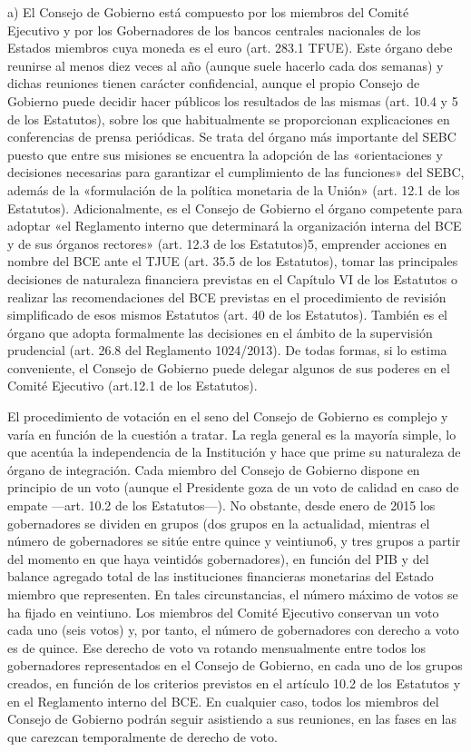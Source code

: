 \documentclass[10pt,a4paper]{article}
\begin{document}
a) El Consejo de Gobierno está compuesto por los miembros del Comité Ejecutivo y por los Gobernadores de los bancos centrales nacionales de los Estados miembros cuya moneda es el euro (art. 283.1 TFUE). Este órgano debe reunirse al menos diez veces al año (aunque suele hacerlo cada dos semanas) y dichas reuniones tienen carácter confidencial, aunque el propio Consejo de Gobierno puede decidir hacer públicos los resultados de las mismas (art. 10.4 y 5 de los Estatutos), sobre los que habitualmente se proporcionan explicaciones en conferencias de prensa periódicas. Se trata del órgano más importante del SEBC puesto que entre sus misiones se encuentra la adopción de las «orientaciones y decisiones necesarias para garantizar el cumplimiento de las funciones» del SEBC, además de la «formulación de la política monetaria de la Unión» (art. 12.1 de los Estatutos). Adicionalmente, es el Consejo de Gobierno el órgano competente para adoptar «el Reglamento interno que determinará la organización interna del BCE y de sus órganos rectores» (art. 12.3 de los Estatutos)5, emprender acciones en nombre del BCE ante el TJUE (art. 35.5 de los Estatutos), tomar las principales decisiones de naturaleza financiera previstas en el Capítulo VI de los Estatutos o realizar las recomendaciones del BCE previstas en el procedimiento de revisión simplificado de esos mismos Estatutos (art. 40 de los Estatutos). También es el órgano que adopta formalmente las decisiones en el ámbito de la supervisión prudencial (art. 26.8 del Reglamento 1024/2013). De todas formas, si lo estima conveniente, el Consejo de Gobierno  puede delegar algunos de sus poderes en el Comité Ejecutivo (art.12.1 de los Estatutos). 

El procedimiento de votación en el seno del Consejo de Gobierno es complejo y varía en función de la cuestión a tratar. La regla general es la mayoría simple, lo que acentúa la independencia de la Institución y hace que prime su naturaleza de órgano de integración. Cada miembro del Consejo de Gobierno dispone en principio de un voto (aunque el Presidente goza de un voto de calidad en caso de empate —art. 10.2 de los Estatutos—). No obstante, desde enero de 2015 los gobernadores se dividen en grupos (dos grupos en la actualidad, mientras el número de gobernadores se sitúe entre quince y veintiuno6, y tres grupos a partir del momento en que haya veintidós gobernadores), en función del PIB y del balance agregado total de las instituciones financieras monetarias del Estado miembro que representen. En tales circunstancias, el número máximo de votos se ha fijado en veintiuno. Los miembros del Comité Ejecutivo conservan un voto cada uno (seis votos) y, por tanto, el número de gobernadores con derecho a voto es de quince. Ese derecho de voto va rotando mensualmente entre todos los gobernadores representados en el Consejo de Gobierno, en cada uno de los grupos creados, en función de los criterios previstos en el artículo 10.2 de los Estatutos y en el Reglamento interno del BCE. En cualquier caso, todos los miembros del Consejo de Gobierno podrán seguir asistiendo a sus reuniones, en las fases en las que carezcan temporalmente de derecho de voto.
\end{document}
